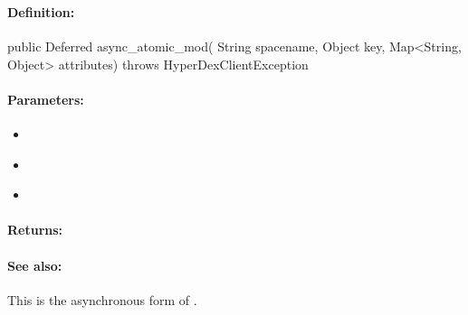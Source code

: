 \pagebreak
\subsubsection{}
\label{api:java:async_atomic_mod}


\paragraph{Definition:}
\begin{javacode}
public Deferred async_atomic_mod(
        String spacename,
        Object key,
        Map<String, Object> attributes) throws HyperDexClientException
\end{javacode}

\paragraph{Parameters:}
\begin{itemize}[noitemsep]
\item {}\\

\item {}\\

\item {}\\

\end{itemize}

\paragraph{Returns:}


\paragraph{See also:}  This is the asynchronous form of .

\pagebreak
\subsubsection{}
\label{api:java:cond_atomic_mod}


